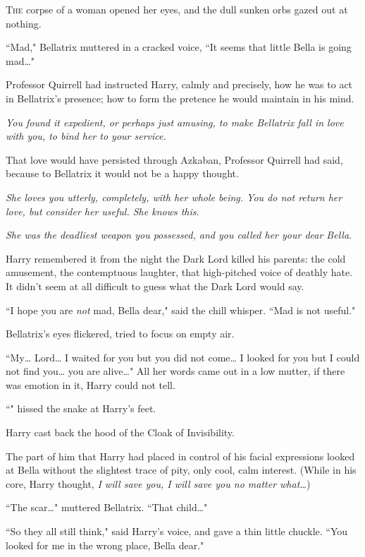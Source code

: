 
\lettrine{T}{he} corpse of a woman opened her eyes, and the dull sunken orbs gazed out at nothing.

``Mad," Bellatrix muttered in a cracked voice, ``It seems that little Bella is going mad{\ldots}"

Professor Quirrell had instructed Harry, calmly and precisely, how he was to act in Bellatrix's presence; how to form the pretence he would maintain in his mind.

\emph{You found it expedient, or perhaps just amusing, to make Bellatrix fall in love with you, to bind her to your service.}

That love would have persisted through Azkaban, Professor Quirrell had said, because to Bellatrix it would not be a happy thought.

\emph{She loves you utterly, completely, with her whole being. You do not return her love, but consider her useful. She knows this.}

\emph{She was the deadliest weapon you possessed, and you called her your dear Bella.}

Harry remembered it from the night the Dark Lord killed his parents: the cold amusement, the contemptuous laughter, that high-pitched voice of deathly hate. It didn't seem at all difficult to guess what the Dark Lord would say.

``I hope you are \emph{not} mad, Bella dear," said the chill whisper. ``Mad is not useful."

Bellatrix's eyes flickered, tried to focus on empty air.

``My{\ldots} Lord{\ldots} I waited for you but you did not come{\ldots} I looked for you but I could not find you{\ldots} you are alive{\ldots}" All her words came out in a low mutter, if there was emotion in it, Harry could not tell.

``" hissed the snake at Harry's feet.

Harry cast back the hood of the Cloak of Invisibility.

The part of him that Harry had placed in control of his facial expressions looked at Bella without the slightest trace of pity, only cool, calm interest. (While in his core, Harry thought, \emph{I will save you, I will save you no matter what{\ldots}})

``The scar{\ldots}" muttered Bellatrix. ``That child{\ldots}"

``So they all still think," said Harry's voice, and gave a thin little chuckle. ``You looked for me in the wrong place, Bella dear."

